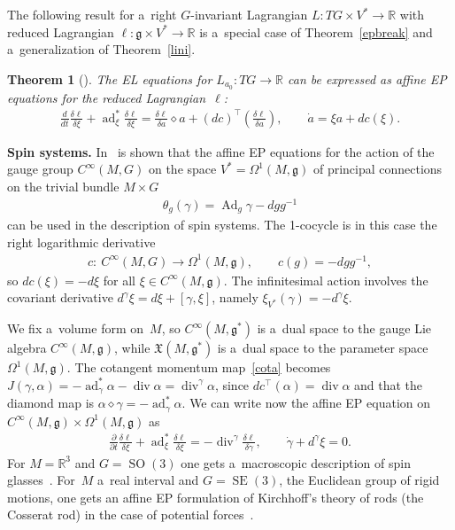 \documentclass[pdftex]{sigma}
\numberwithin{equation}{section}
\newtheorem{Theorem}{Theorem}[section]
\begin{document}
The following result for a~right $G$-invariant Lagrangian $L:TG\times V^*\rightarrow\mathbb{R}$ with reduced Lagrangian
$\ell:\mathfrak{g}\times V^*\rightarrow\mathbb{R}$ is a~special case of Theorem~\ref{epbreak} and a~generalization of
Theorem~\ref{lini}.

\begin{Theorem}[\cite{GBR}]
The EL equations for $L_{a_0}:TG\to\mathbb R$ can be expressed as affine EP equations for the reduced
Lagrangian~$\ell$:
\begin{gather}
\label{epaffine}
{\frac{d}{dt}\frac{\delta\ell}{\delta\xi}+\operatorname{ad}^*_\xi\frac{\delta \ell}{\delta\xi}=\frac{\delta\ell}{\delta
a}\diamond a+(dc)^\top\left(\frac{\delta \ell}{\delta a}\right)},
\qquad
\dot{a}=\xi a+dc(\xi).
\end{gather}
\end{Theorem}

{\bf Spin systems.} In~\cite{GBR} is shown that the af\/f\/ine EP equations for the action of the gauge group
$C^{\infty}(M,G)$ on the space $V^*=\Omega^1(M,\mathfrak g)$ of principal connections on the trivial bundle $M\times G$
\begin{gather}
\label{gaug}
\theta_g(\gamma)=\operatorname{Ad}_{g}\gamma-dgg^{-1}
\end{gather}
can be used in the description of spin systems.
The 1-cocycle is in this case the right logarithmic derivative
\begin{gather*}
c: \ C^{\infty}(M,G)\to\Omega^1(M,\mathfrak g),
\qquad
c(g)=-dgg^{-1},
\end{gather*}
so $dc(\xi)=-d\xi$ for all $\xi\in C^{\infty}(M,\mathfrak g)$.
The inf\/initesimal action involves the covariant derivative $d^\gamma\xi=d\xi+[\gamma,\xi]$, namely
$\xi_{V^*}(\gamma)=-d^\gamma\xi$.

We f\/ix a~volume form on~$M$, so $C^{\infty}(M,\mathfrak g^*)$ is a~dual space to the gauge Lie algebra
$C^{\infty}(M,\mathfrak g)$, while $\mathfrak X(M,\mathfrak g^*)$ is a~dual space to the parameter space
$\Omega^1(M,\mathfrak g)$.
The cotangent momentum map~\eqref{cota} becomes $J(\gamma,\alpha)
=-\operatorname{ad}^*_\gamma\alpha-\operatorname{div}\alpha=\operatorname{div}^\gamma\alpha$, since
$dc^\top(\alpha)=\operatorname{div}\alpha$ and that the diamond map is
$\alpha\diamond\gamma=-\operatorname{ad}^*_\gamma\alpha$.
We can write now the af\/f\/ine EP equation on $C^{\infty}(M,\mathfrak g)\times\Omega^1(M,\mathfrak g)$ as
\begin{gather}
\label{spin}
\frac{\partial}{\partial
t}\frac{\delta\ell}{\delta\xi}+\operatorname{ad}^*_\xi\frac{\delta\ell}{\delta\xi}=-\operatorname{div}^\gamma\frac{\delta\ell}{\delta
\gamma},
\qquad
\dot\gamma+d^\gamma\xi=0.
\end{gather}
For $M=\mathbb R^3$ and $G=\operatorname{SO}(3)$ one gets a~macroscopic description of spin glasses~\cite{GBR}.
For~$M$ a~real interval and $G=\operatorname{SE}(3)$, the Euclidean group of rigid motions, one gets an af\/f\/ine EP
formulation of Kirchhof\/f's theory of rods (the Cosserat rod) in the case of potential forces~\cite{GBHR}.
\end{document}

